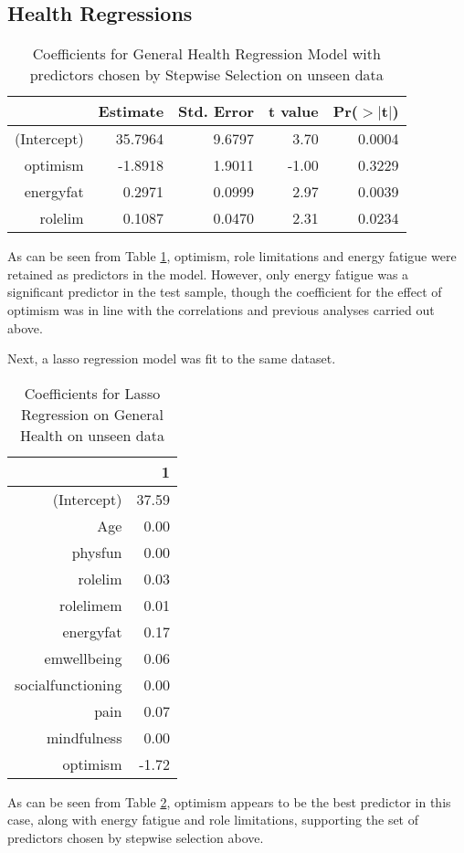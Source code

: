 \documentclass{article}
\begin{document}
\subsection{Health Regressions}




\begin{table}[ht]
\centering
\begin{tabular}{rrrrr}
  \hline
 & Estimate & Std. Error & t value & Pr($>$$|$t$|$) \\ 
  \hline
(Intercept) & 35.7964 & 9.6797 & 3.70 & 0.0004 \\ 
  optimism & -1.8918 & 1.9011 & -1.00 & 0.3229 \\ 
  energyfat & 0.2971 & 0.0999 & 2.97 & 0.0039 \\ 
  rolelim & 0.1087 & 0.0470 & 2.31 & 0.0234 \\ 
   \hline
\end{tabular}
\caption{Coefficients for General Health Regression Model with predictors chosen by Stepwise Selection on unseen data} 
\label{tab:hom1healthsteptest}
\end{table}As can be seen from Table \ref{tab:hom1healthsteptest}, optimism, role limitations and energy fatigue were retained as predictors in the model. However, only energy fatigue was a significant predictor in the test sample, though the coefficient for the effect of optimism was in line with the correlations and previous analyses carried out above. 

Next, a lasso regression model was fit to the same dataset. 


\begin{table}[ht]
\centering
\begin{tabular}{rr}
  \hline
 & 1 \\ 
  \hline
(Intercept) & 37.59 \\ 
  Age & 0.00 \\ 
  physfun & 0.00 \\ 
  rolelim & 0.03 \\ 
  rolelimem & 0.01 \\ 
  energyfat & 0.17 \\ 
  emwellbeing & 0.06 \\ 
  socialfunctioning & 0.00 \\ 
  pain & 0.07 \\ 
  mindfulness & 0.00 \\ 
  optimism & -1.72 \\ 
   \hline
\end{tabular}
\caption{Coefficients for Lasso Regression on General Health on unseen data} 
\label{tab:hom1healthlasso}
\end{table}
As can be seen from Table \ref{tab:hom1healthlasso}, optimism appears to be the best predictor in this case, along with energy fatigue and role limitations, supporting the set of predictors chosen by stepwise selection above. 
\end{document}
